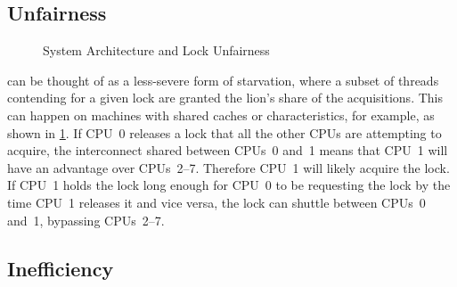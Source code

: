 \subsection{Unfairness}
\label{sec:locking:Unfairness}

\begin{figure}
\centering
{}
\caption{System Architecture and Lock Unfairness}
\label{fig:locking:System Architecture and Lock Unfairness}
\end{figure}

 can be thought of as a less-severe form of starvation,
where a subset of threads contending for a given lock are granted
the lion's share of the acquisitions.
This can happen on machines with shared caches or  characteristics,
for example, as shown in
\cref{fig:locking:System Architecture and Lock Unfairness}.
If CPU~0 releases a lock that all the other CPUs are attempting
to acquire, the interconnect shared between CPUs~0 and~1 means that
CPU~1 will have an advantage over CPUs~2--7.
Therefore CPU~1 will likely acquire the lock.
If CPU~1 holds the lock long enough for CPU~0 to be requesting the
lock by the time CPU~1 releases it and vice versa, the lock can
shuttle between CPUs~0 and~1, bypassing CPUs~2--7.

\QuickQuizEnd

\subsection{Inefficiency}
\label{sec:locking:Inefficiency}

